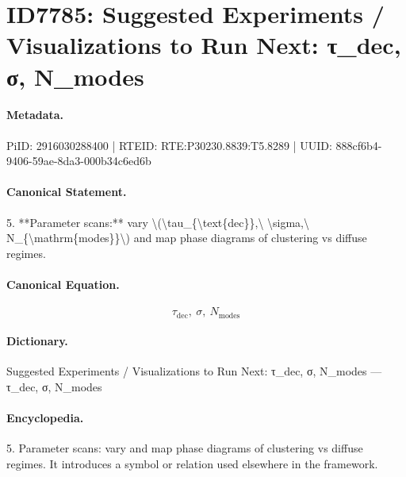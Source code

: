 \section*{ID7785: Suggested Experiments / Visualizations to Run Next: τ\_dec, σ, N\_modes}
\paragraph{Metadata.}
PiID: 2916030288400 | RTEID: RTE:P30230.8839:T5.8289 | UUID: 888cf6b4-9406-59ae-8da3-000b34c6ed6b

\paragraph{Canonical Statement.}
5. **Parameter scans:** vary \textbackslash{}(\textbackslash{}tau\_\{\textbackslash{}text\{dec\}\},\textbackslash{} \textbackslash{}sigma,\textbackslash{} N\_\{\textbackslash{}mathrm\{modes\}\}\textbackslash{}) and map phase diagrams of clustering vs diffuse regimes.

\paragraph{Canonical Equation.}
\[
\tau_{\text{dec}},\ \sigma,\ N_{\mathrm{modes}}
\]

\paragraph{Dictionary.}
Suggested Experiments / Visualizations to Run Next: τ\_dec, σ, N\_modes — τ\_dec, σ, N\_modes

\paragraph{Encyclopedia.}
5. Parameter scans: vary and map phase diagrams of clustering vs diffuse regimes. It introduces a symbol or relation used elsewhere in the framework.

